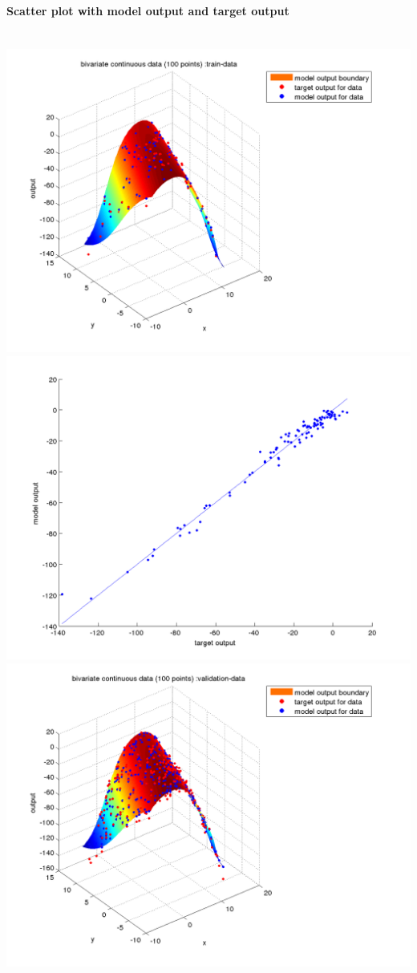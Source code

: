 \documentclass[fleqn]{article}
\newcommand{\myparagraph}[1]{\paragraph{#1}\mbox{}\\}
\begin{document}
\myparagraph{Scatter plot with model output and target output}
\includegraphics[scale=0.4]{./pics/bivariate100/_2_4/_2_4_epoch_50_train-data_scatter3d}
\includegraphics[scale=0.4]{./pics/bivariate100/_2_4/_2_4_epoch_50_train-data_scatter2d}
\includegraphics[scale=0.4]{./pics/bivariate100/_2_4/_2_4_epoch_50_validation-data_scatter3d}
\end{document}
